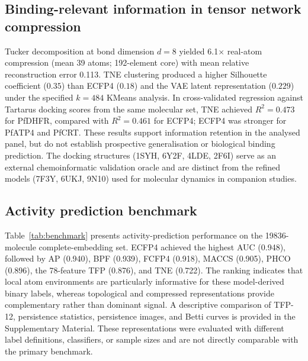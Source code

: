 \documentclass[pdflatex,sn-mathphys-num]{sn-jnl}%
\begin{document}
\subsection{Binding-relevant information in tensor network compression}

Tucker decomposition at bond dimension $d = 8$ yielded \num{6.1}$\times$ real-atom compression (mean \num{39} atoms; \num{192}-element core) with mean relative reconstruction error \num{0.113}. TNE clustering produced a higher Silhouette coefficient ($\num{0.35}$) than ECFP4 ($\num{0.18}$) and the VAE latent representation ($\num{0.229}$) under the specified $k=484$ KMeans analysis. In cross-validated regression against Tartarus docking scores from the same molecular set, TNE achieved $R^2=\num{0.473}$ for PfDHFR, compared with $R^2=\num{0.461}$ for ECFP4; ECFP4 was stronger for PfATP4 and PfCRT. These results support information retention in the analysed panel, but do not establish prospective generalisation or biological binding prediction. The docking structures (1SYH, 6Y2F, 4LDE, 2F6I) serve as an external chemoinformatic validation oracle and are distinct from the refined models (7F3Y, 6UKJ, 9N10) used for molecular dynamics in companion studies.

\subsection{Activity prediction benchmark}\label{sec:results_benchmark}

Table~\ref{tab:benchmark} presents activity-prediction performance on the \num{19836}-molecule complete-embedding set. ECFP4 achieved the highest AUC (\num{0.948}), followed by AP (\num{0.940}), BPF (\num{0.939}), FCFP4 (\num{0.918}), MACCS (\num{0.905}), PHCO (\num{0.896}), the 78-feature TFP (\num{0.876}), and TNE (\num{0.722}). The ranking indicates that local atom environments are particularly informative for these model-derived binary labels, whereas topological and compressed representations provide complementary rather than dominant signal. A descriptive comparison of TFP-12, persistence statistics, persistence images, and Betti curves is provided in the Supplementary Material. These representations were evaluated with different label definitions, classifiers, or sample sizes and are not directly comparable with the primary benchmark.
\end{document}

